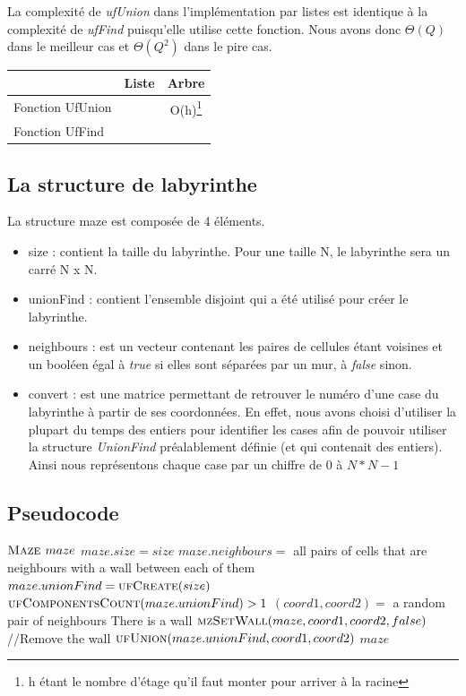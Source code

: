 La complexité de \textit{ufUnion} dans l'implémentation par listes est identique à la complexité de \textit{ufFind} puisqu'elle utilise cette fonction. Nous avons donc $\Theta(Q)$ dans le meilleur cas et $\Theta(Q^2)$ dans le pire cas.

	\begin{tabular}{|l||c|c|}
	\hline
  & Liste & Arbre\\
  \hline\hline
  Fonction UfUnion & & O(h)\footnote{h étant le nombre d'étage qu'il faut monter pour arriver à la racine} \\
  Fonction UfFind & & \\
  \hline
\end{tabular}

\subsection{La structure de labyrinthe} %
La structure maze est composée de 4 éléments.
\begin{itemize}
\item size : contient la taille du labyrinthe. Pour une taille N, le labyrinthe sera un carré N x N.
\item unionFind : contient l'ensemble disjoint qui a été utilisé pour créer le labyrinthe.
\item neighbours : est un vecteur contenant les paires de cellules étant voisines et un booléen égal à \textit{true} si elles sont séparées par un mur, à \textit{false} sinon.
\item convert : est une matrice permettant de retrouver le numéro d'une case du labyrinthe à partir de ses coordonnées.
\bigbreak
En effet, nous avons choisi d'utiliser la plupart du temps des entiers pour identifier les cases afin de pouvoir utiliser la structure \textit{UnionFind} préalablement définie (et qui contenait des entiers). Ainsi nous représentons chaque case par un chiffre de $0$ à $N *N - 1$
\end{itemize}

\subsection{Pseudocode} %
\begin{codebox}
\li $\textnormal{\scshape Maze } maze$
\li $maze.size = size$
\li $maze.neighbours =$ all pairs of cells that are neighbours with a wall between each of them
\li $maze.unionFind = \textnormal{\scshape ufCreate}(size)$
\li \While $\textnormal{\scshape ufComponentsCount}(maze.unionFind) > 1$
\Do
\li 	$(coord1, coord2) =$ a random pair of neighbours
\li		\If There is a wall
\li \Then $\textnormal{\scshape mzSetWall}(maze, coord1, coord2, false)$ //Remove the wall
\li	$\textnormal{\scshape ufUnion}(maze.unionFind, coord1, coord2)$
\End
\End
\li \Return $maze$
\End
\end{codebox}

